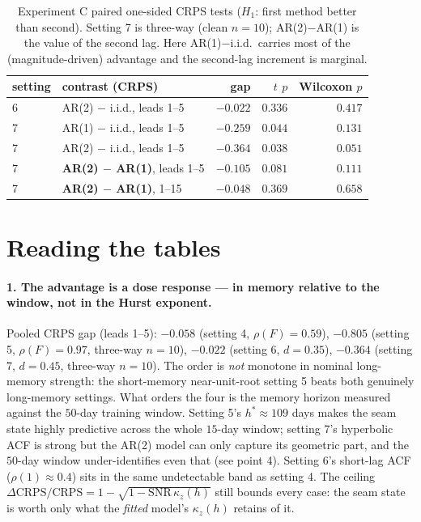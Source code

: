 \documentclass[11pt]{article}
\begin{document}
\begin{table}[ht]
\centering
\caption{Experiment C paired one-sided CRPS tests ($H_1$: first method
better than second). Setting 7 is three-way (clean $n = 10$);
AR(2)$-$AR(1) is the value of the second lag. Here AR(1)$-$i.i.d.\ carries
most of the (magnitude-driven) advantage and the second-lag increment is
marginal.}
\label{tab:testsC}
\small
\begin{tabular}{llrrr}
\toprule
setting & contrast (CRPS) & gap & $t$ $p$ & Wilcoxon $p$ \\
\midrule
6 & AR(2) $-$ i.i.d., leads 1--5   & $-0.022$ & $0.336$ & $0.417$ \\
\midrule
7 & AR(1) $-$ i.i.d., leads 1--5   & $-0.259$ & $\mathbf{0.044}$ & $0.131$ \\
7 & AR(2) $-$ i.i.d., leads 1--5   & $-0.364$ & $\mathbf{0.038}$ & $0.051$ \\
7 & \textbf{AR(2) $-$ AR(1)}, leads 1--5 & $-0.105$ & $0.081$ & $0.111$ \\
7 & \textbf{AR(2) $-$ AR(1)}, 1--15 & $-0.048$ & $0.369$ & $0.658$ \\
\bottomrule
\end{tabular}
\end{table}

\section{Reading the tables}

\paragraph{1. The advantage is a dose response --- in memory relative to the
window, not in the Hurst exponent.} Pooled CRPS gap (leads 1--5): $-0.058$
(setting 4, $\rho(F) = 0.59$), $-0.805$ (setting 5, $\rho(F) = 0.97$,
three-way $n = 10$), $-0.022$ (setting 6, $d = 0.35$), $-0.364$
(setting 7, $d = 0.45$, three-way $n = 10$). The order
is \emph{not} monotone in nominal long-memory strength: the short-memory
near-unit-root setting 5 beats both genuinely long-memory settings. What
orders the four is the memory horizon measured against the $50$-day training
window. Setting 5's $h^\ast \approx 109$ days makes the seam state highly
predictive across the whole $15$-day window; setting 7's hyperbolic ACF is
strong but the AR(2) model can only capture its geometric part, and the
$50$-day window under-identifies even that (see point 4). Setting 6's
short-lag ACF ($\rho(1) \approx 0.4$) sits in the same undetectable band as
setting 4. The ceiling $\Delta\mathrm{CRPS}/\mathrm{CRPS} = 1 - \sqrt{1 -
\mathrm{SNR}\,\kappa_z(h)}$ still bounds every case: the seam state is worth
only what the \emph{fitted} model's $\kappa_z(h)$ retains of it.
\end{document}

